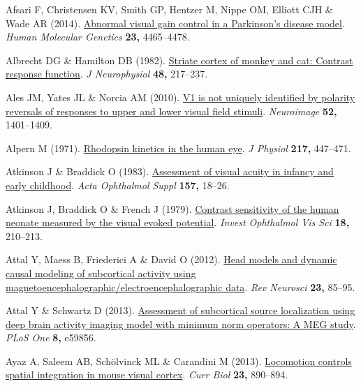\documentclass[
  letterpaper,
  DIV=11,
  numbers=noendperiod]{scrartcl}
\newlength{\cslhangindent}
\newenvironment{CSLReferences}[2] %
 {\begin{list}{}{%
  \setlength{\itemindent}{0pt}
  \setlength{\leftmargin}{0pt}
  \setlength{\parsep}{0pt}
  \ifodd #1
   \setlength{\leftmargin}{\cslhangindent}
   \setlength{\itemindent}{-1\cslhangindent}
  \fi
  \setlength{\itemsep}{#2\baselineskip}}}
 {\end{list}}
\begin{document}
\label{refs}
\begin{CSLReferences}{1}{1}
Afsari F, Christensen KV, Smith GP, Hentzer M, Nippe OM, Elliott CJH \&
Wade AR (2014). \href{https://doi.org/10.1093/hmg/ddu159}{Abnormal
visual gain control in a {Parkinson}'s disease model}. \emph{Human
Molecular Genetics} \textbf{23,} 4465--4478.

Albrecht DG \& Hamilton DB (1982).
\href{https://doi.org/10.1152/jn.1982.48.1.217}{Striate cortex of monkey
and cat: Contrast response function}. \emph{J Neurophysiol} \textbf{48,}
217--237.

Ales JM, Yates JL \& Norcia AM (2010).
\href{https://doi.org/10.1016/j.neuroimage.2010.05.016}{V1 is not
uniquely identified by polarity reversals of responses to upper and
lower visual field stimuli}. \emph{Neuroimage} \textbf{52,} 1401--1409.

Alpern M (1971).
\href{https://doi.org/10.1113/jphysiol.1971.sp009580}{Rhodopsin kinetics
in the human eye}. \emph{J Physiol} \textbf{217,} 447--471.

Atkinson J \& Braddick O (1983).
\href{https://doi.org/10.1111/j.1755-3768.1983.tb03927.x}{Assessment of
visual acuity in infancy and early childhood}. \emph{Acta Ophthalmol
Suppl} \textbf{157,} 18--26.

Atkinson J, Braddick O \& French J (1979).
\href{https://www.ncbi.nlm.nih.gov/pubmed/761974}{Contrast sensitivity
of the human neonate measured by the visual evoked potential}.
\emph{Invest Ophthalmol Vis Sci} \textbf{18,} 210--213.

Attal Y, Maess B, Friederici A \& David O (2012).
\href{https://doi.org/10.1515/rns.2011.056}{Head models and dynamic
causal modeling of subcortical activity using
magnetoencephalographic/electroencephalographic data}. \emph{Rev
Neurosci} \textbf{23,} 85--95.

Attal Y \& Schwartz D (2013).
\href{https://doi.org/10.1371/journal.pone.0059856}{Assessment of
subcortical source localization using deep brain activity imaging model
with minimum norm operators: A MEG study}. \emph{PLoS One} \textbf{8,}
e59856.

Ayaz A, Saleem AB, Schölvinck ML \& Carandini M (2013).
\href{https://doi.org/10.1016/j.cub.2013.04.012}{Locomotion controls
spatial integration in mouse visual cortex}. \emph{Curr Biol}
\textbf{23,} 890--894.


\end{CSLReferences}
\end{document}
